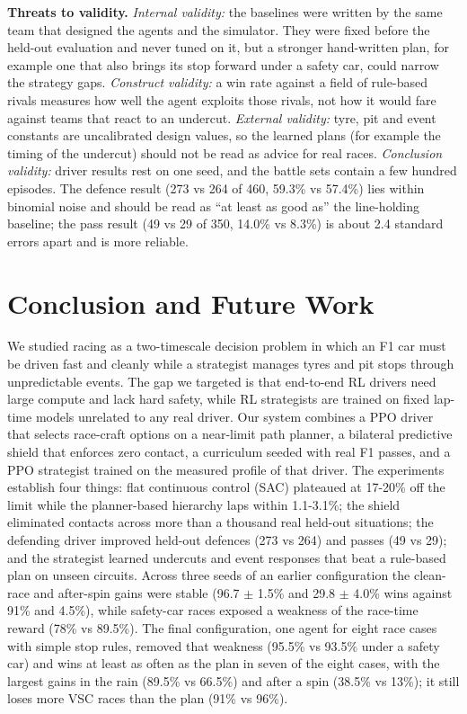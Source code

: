 \documentclass{ieeeaccess}
\begin{document}
\textbf{Threats to validity.}
\emph{Internal validity:} the baselines were written by the same team that designed the
agents and the simulator. They were fixed before the held-out evaluation and never
tuned on it, but a stronger hand-written plan, for example one that also brings its
stop forward under a safety car, could narrow the strategy gaps.
\emph{Construct validity:} a win rate against a field of rule-based rivals measures how
well the agent exploits those rivals, not how it would fare against teams that
react to an undercut.
\emph{External validity:} tyre, pit and event constants are uncalibrated design values,
so the learned plans (for example the timing of the undercut) should not be read as
advice for real races.
\emph{Conclusion validity:} driver results rest on one seed, and the battle sets contain a
few hundred episodes. The defence result (273 vs 264 of 460, 59.3\% vs 57.4\%) lies
within binomial noise and should be read as ``at least as good as'' the line-holding
baseline; the pass result (49 vs 29 of 350, 14.0\% vs 8.3\%) is about 2.4 standard
errors apart and is more reliable.

\section{Conclusion and Future Work}

We studied racing as a two-timescale decision problem in which an F1 car must be
driven fast and cleanly while a strategist manages tyres and pit stops through
unpredictable events. The gap we targeted is that end-to-end RL drivers need large
compute and lack hard safety, while RL strategists are trained on fixed lap-time
models unrelated to any real driver. Our system combines a PPO driver that selects
race-craft options on a near-limit path planner, a bilateral predictive shield that
enforces zero contact, a curriculum seeded with real F1 passes, and a PPO
strategist trained on the measured profile of that driver. The experiments
establish four things: flat continuous control (SAC) plateaued at 17-20\% off the
limit while the planner-based hierarchy laps within 1.1-3.1\%; the shield eliminated
contacts across more than a thousand real held-out situations; the defending driver
improved held-out defences (273 vs 264) and passes (49 vs 29); and the strategist
learned undercuts and event responses that beat a rule-based plan on unseen
circuits. Across three seeds of an earlier configuration the clean-race and
after-spin gains were stable (96.7 \ensuremath{\pm} 1.5\% and 29.8 \ensuremath{\pm} 4.0\% wins against 91\% and
4.5\%), while safety-car races exposed a weakness of the race-time reward (78\% vs
89.5\%). The final configuration, one agent for eight race cases with simple stop
rules, removed that weakness (95.5\% vs 93.5\% under a safety car) and wins at least
as often as the plan in seven of the eight cases, with the largest gains in the
rain (89.5\% vs 66.5\%) and after a spin (38.5\% vs 13\%); it still loses more VSC
races than the plan (91\% vs 96\%).
\end{document}
